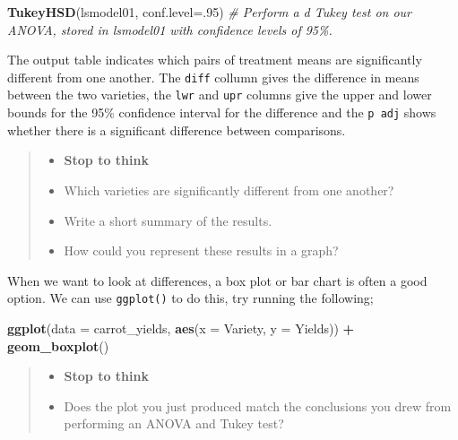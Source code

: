 \documentclass[
]{book}
\newenvironment{Shaded}{\begin{snugshade}}{\end{snugshade}}
\newcommand{\AttributeTok}[1]{\textcolor[rgb]{0.13,0.29,0.53}{#1}}
\newcommand{\CommentTok}[1]{\textcolor[rgb]{0.56,0.35,0.01}{\textit{#1}}}
\newcommand{\DecValTok}[1]{\textcolor[rgb]{0.00,0.00,0.81}{#1}}
\newcommand{\FunctionTok}[1]{\textcolor[rgb]{0.13,0.29,0.53}{\textbf{#1}}}
\newcommand{\NormalTok}[1]{#1}
\newcommand{\SpecialCharTok}[1]{\textcolor[rgb]{0.81,0.36,0.00}{\textbf{#1}}}
\providecommand{\tightlist}{%
  \setlength{\itemsep}{0pt}\setlength{\parskip}{0pt}}
\begin{document}
\begin{Shaded}
\begin{Highlighting}[]
\FunctionTok{TukeyHSD}\NormalTok{(lsmodel01, }\AttributeTok{conf.level=}\NormalTok{.}\DecValTok{95}\NormalTok{) }
\CommentTok{\# Perform a d Tukey test on our ANOVA, stored in lsmodel01 with confidence levels of 95\%.}
\end{Highlighting}
\end{Shaded}

The output table indicates which pairs of treatment means are significantly different from one another. The \texttt{diff} collumn gives the difference in means between the two varieties, the \texttt{lwr} and \texttt{upr} columns give the upper and lower bounds for the 95\% confidence interval for the difference and the \texttt{p\ adj} shows whether there is a significant difference between comparisons.

\begin{quote}
\begin{itemize}
\tightlist
\item
  \textbf{Stop to think}
\item
  Which varieties are significantly different from one another?
\item
  Write a short summary of the results.
\item
  How could you represent these results in a graph?
\end{itemize}
\end{quote}

When we want to look at differences, a box plot or bar chart is often a good option. We can use \texttt{ggplot()} to do this, try running the following;

\begin{Shaded}
\begin{Highlighting}[]
\FunctionTok{ggplot}\NormalTok{(}\AttributeTok{data =}\NormalTok{ carrot\_yields, }\FunctionTok{aes}\NormalTok{(}\AttributeTok{x =}\NormalTok{ Variety, }\AttributeTok{y =}\NormalTok{ Yields)) }\SpecialCharTok{+}
  \FunctionTok{geom\_boxplot}\NormalTok{()}
\end{Highlighting}
\end{Shaded}

\begin{quote}
\begin{itemize}
\tightlist
\item
  \textbf{Stop to think}
\item
  Does the plot you just produced match the conclusions you drew from performing an ANOVA and Tukey test?
\end{itemize}
\end{quote}
\end{document}
